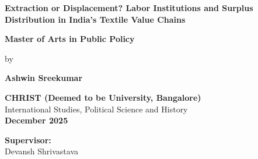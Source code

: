 \begin{titlepage}
	\begin{center}
		
		\vspace*{2cm}
		
		{\LARGE \textbf{Extraction or Displacement? Labor Institutions and Surplus Distribution in India's Textile Value Chains}}
		
		\vspace{1.5cm}
		
		
		\vspace{0.5cm}
		
		{\LARGE \textbf{Master of Arts in Public Policy}}
		
		\vspace{1.5cm}
		
		{\Large by}
		
		\vspace{0.5cm}
		
		{\LARGE \textbf{Ashwin Sreekumar}}
		
		\vspace{1.5cm}
		
		{\Large 
			\textbf{CHRIST (Deemed to be University, Bangalore)} \\
			International Studies, Political Science and History \\
			\vspace{0.5cm}
			\textbf{December 2025}
		}
		
		\vspace{2cm}
		
	    \textbf{Supervisor:} \\
		Devansh Shrivastava

				
		
		
	\end{center}
\end{titlepage}
